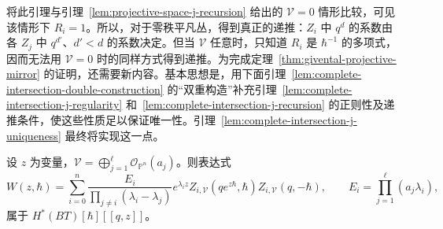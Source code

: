 将此引理与引理~\ref{lem:projective-space-j-recursion} 给出的 $\mathcal V=0$ 情形比较，可见该情形下 $R_i=1$。所以，对于零秩平凡丛，得到真正的递推：$Z_i$ 中 $q^d$ 的系数由各 $Z_j$ 中 $q^{d'}$、$d'<d$ 的系数决定。但当 $\mathcal V$ 任意时，只知道 $R_i$ 是 $\hbar^{-1}$ 的多项式，因而无法用 $\mathcal V=0$ 时的同样方式得到递推。为完成定理~\ref{thm:givental-projective-mirror} 的证明，还需要新内容。基本思想是，用下面引理~\ref{lem:complete-intersection-double-construction} 的“双重构造”补充引理~\ref{lem:complete-intersection-j-regularity} 和~\ref{lem:complete-intersection-j-recursion} 的正则性及递推条件，使这些性质足以保证唯一性。引理~\ref{lem:complete-intersection-j-uniqueness} 最终将实现这一点。
\begin{lemma}\label{lem:complete-intersection-double-construction}
设 $z$ 为变量，$\mathcal V=\bigoplus_{j=1}^{\ell}\mathcal O_{\mathbb P^n}(a_j)$。则表达式
\[
W(z,\hbar)=\sum_{i=0}^n\frac{E_i}{\prod_{j\ne i}(\lambda_i-\lambda_j)}e^{\lambda_i z}
Z_{i,\mathcal V}(qe^{z\hbar},\hbar)Z_{i,\mathcal V}(q,-\hbar),\qquad E_i=\prod_{j=1}^{\ell}(a_j\lambda_i),
\]
属于 $H^*(BT)[\hbar][[q,z]]$。
\end{lemma}
